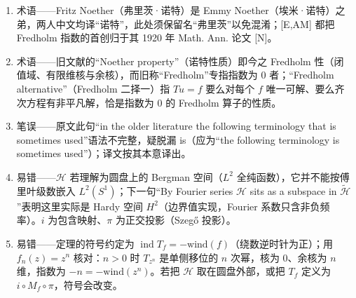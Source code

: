 \documentclass[11pt]{amsart}
\theoremstyle{definition}
\theoremstyle{remark}
\theoremstyle{plain}
\numberwithin{equation}{section}
\renewcommand{\:}{\colon}
\newcommand{\cir}{S^1}
\DeclareMathOperator{\ind}{ind}
\newcommand{\sH}{\mathscr{H}}
\newcommand{\tsH}{\widetilde{\sH}}
\begin{document}
\begin{enumerate}[leftmargin=2.2em,itemsep=2pt,topsep=2pt]
  \item 术语——Fritz Noether（弗里茨·诺特）是 Emmy Noether（埃米·诺特）之弟，两人中文均译“诺特”，此处须保留名“弗里茨”以免混淆；[E,AM] 都把 Fredholm 指数的首创归于其 1920 年 Math. Ann. 论文 [N]。
  \item 术语——旧文献的“Noether property”（诺特性质）即今之 Fredholm 性（闭值域、有限维核与余核），而旧称“Fredholm”专指指数为 $0$ 者；“Fredholm alternative”（Fredholm 二择一）指 $Tu=f$ 要么对每个 $f$ 唯一可解、要么齐次方程有非平凡解，恰是指数为 $0$ 的 Fredholm 算子的性质。
  \item 笔误——原文此句“in the older literature the following terminology that is sometimes used”语法不完整，疑脱漏 is（应为“the following terminology is sometimes used”）；译文按其本意译出。
  \item 易错——$\sH$ 若理解为圆盘上的 Bergman 空间（$L^2$ 全纯函数），它并不能按傅里叶级数嵌入 $L^2(\cir)$；下一句“By Fourier series $\sH$ sits as a subspace in $\tsH$”表明这里实际是 Hardy 空间 $H^2$（边界值实现，Fourier 系数只含非负频率）。$i$ 为包含映射、$\pi$ 为正交投影（Szegő 投影）。
  \item 易错——定理的符号约定为 $\ind T_f=-\mathrm{wind}(f)$（绕数逆时针为正）；用 $f_n(z)=z^n$ 核对：$n>0$ 时 $T_{z^n}$ 是单侧移位的 $n$ 次幂，核为 $0$、余核为 $n$ 维，指数为 $-n=-\mathrm{wind}(z^n)$。若把 $\sH$ 取在圆盘外部，或把 $T_f$ 定义为 $i\circ M_f\circ\pi$，符号会改变。
\end{enumerate}
\end{document}
